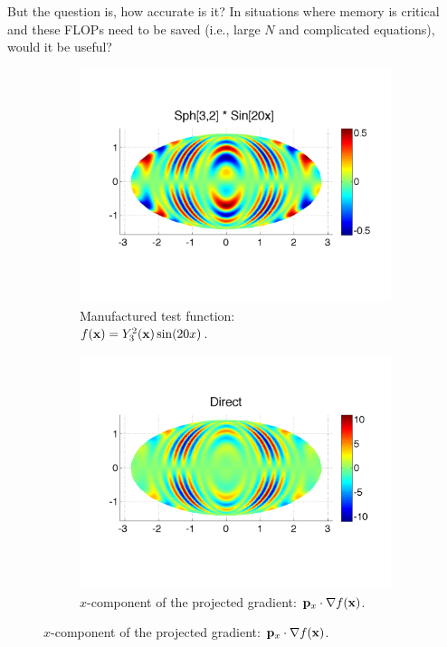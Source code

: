 But the question is, how accurate is it? In situations where memory is critical and these FLOPs need to be saved (i.e., large $N$ and complicated equations), would it be useful?



\begin{figure}[htbp]
	\centering
	\begin{subfigure}[b]{0.425\textwidth}
	\includegraphics[width=1.0\textwidth]{../figures/appendices/direct_vs_indirect_weights/compare_weight_generation/xsfc_vs_xsfc_alt_on_sph32_times_sine_20x/sph32_times_sin20x.pdf}
	\caption{Manufactured test function: \\  $f(\mathbf{x}) = Y_{3}^{2}(\mathbf{x})\sin(20x)$.  }
	\end{subfigure}
	\begin{subfigure}[b]{0.425\textwidth}
	\includegraphics[width=1.0\textwidth]{../figures/appendices/direct_vs_indirect_weights/compare_weight_generation/xsfc_vs_xsfc_alt_on_sph32_times_sine_20x/pdx_sph32_times_sin20x.pdf}
	\caption{$x$-component of the projected gradient: 
	$\mathbf{p}_{x} \cdot \nabla f(\mathbf{x})$.  }
	\end{subfigure}
	

\end{figure}
